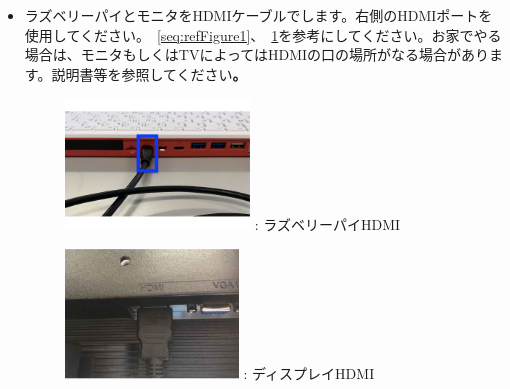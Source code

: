 \documentclass[a4paper,12pt]{jarticle}
\begin{document}
\begin{enumerate}
\begin{enumerate}
        \begin{itemize}
          \item
                ラズベリーパイとモニタをHDMIケーブルでします。右側のHDMIポートを使用してください。~\ref{seq:refFigure1}、~\ref{seq:refFigure2}を参考にしてください。お家でやる場合は、モニタもしくはTVによってはHDMIの口の場所がなる場合があります。説明書等を参照してください\textbf{。}


                \begin{figure}[h]
		\centering
                  \begin{minipage}{0.45\textwidth}
                    {\upshape
                      \includegraphics[height=3.471cm]{figure222023.pdf}
                      \newline
                      {\theFigure\label{seq:refFigure1}}:
                      ラズベリーパイHDMI}
                  \end{minipage}
		\centering
                  \begin{minipage}{0.45\textwidth}
                    {\upshape
                      \includegraphics[height=3.471cm]{textbook-img016.png}
                      \newline
                      {\theFigure\label{seq:refFigure2}}:
                      ディスプレイHDMI}
                  \end{minipage}
                \end{figure}


\end{itemize}
\end{enumerate}
\end{enumerate}
\end{document}
